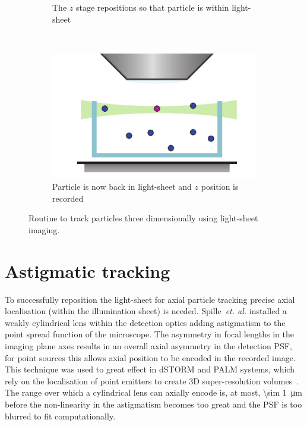 \begin{figure}
\begin{subfigure}[t]{0.4\linewidth}
		\caption{The \(z\) stage repositions so that particle is within light-sheet}
		\label{fig:SPIMSPT3}
	\end{subfigure}~~
	\begin{subfigure}[t]{0.4\linewidth}
		\centering
		\includegraphics{Chapters/spt/Figs/PDF/tracking/4_piezo_track}
		\caption{Particle is now back in light-sheet and \(z\) position is recorded}
		\label{fig:SPIMSPT4}
	\end{subfigure}
	\caption{Routine to track particles three dimensionally using light-sheet imaging.}
	\label{fig:SPIMSPT}
\end{figure}

\section{Astigmatic tracking}

To successfully reposition the light-sheet for axial particle tracking %
precise axial localisation (within the illumination sheet) is needed.
Spille~\emph{et. al.} installed a weakly cylindrical lens within the detection optics adding astigmatism to the point spread function of the microscope.
The asymmetry in focal lengths
in the imaging plane axes %
results in an overall axial asymmetry in the detection \gls{PSF}, for point sources this allows axial position to be encoded in the recorded image.
This technique was used to great effect in \gls{dSTORM} and PALM systems, which rely on the localisation of point emitters to create \gls{3D} \gls{super-resolution} volumes~\cite{huangThreeDimensionalSuperResolutionImaging2008}.
The range over which a cylindrical lens can axially encode is, at most, \SI{\sim 1}{\micro\metre} before the non-linearity in the astigmatism becomes too great and the \gls{PSF} is too blurred to fit computationally.

